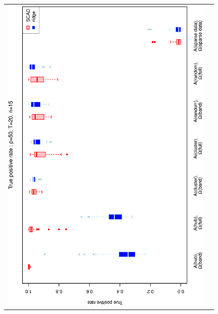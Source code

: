 \documentclass[a4paper]{article}
\begin{document}
\begin{figure}[h!]
\centering
\begin{tabular}{cc}
\includegraphics[scale=0.5,angle=270]{ROCtpr50T20N15a.eps}\\

\end{tabular}
\end{figure}
\end{document}
